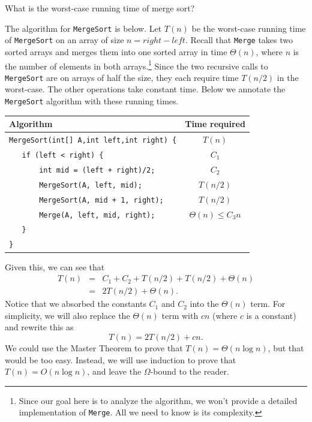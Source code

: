 \begin{exa}\label{exa:meregesortAnal}
What is the worst-case running time of merge sort?
\begin{sol}
The algorithm for \verb+MergeSort+ is below.
Let $T(n)$ be the worst-case running time of 
\verb+MergeSort+ on an array of size $n=right-left$.
Recall that \verb+Merge+ takes two sorted arrays and merges them into
one sorted array in time $\Theta(n)$, where $n$ is the number of
elements in both arrays.\footnote{Since our goal here is to analyze the algorithm,
we won't provide a detailed implementation of \texttt{Merge}. %
All we need to know is its complexity.}  
Since the two recursive calls to \verb+MergeSort+
 are on arrays
of half the size, they each require time $T(n/2)$ in the worst-case.
The other operations take constant time.  Below we annotate the \verb+MergeSort+ algorithm
with these running times.
\begin{center}
\begin{tabular}{|l|c|}
\hline
Algorithm&Time required\\
\hline
\verb-MergeSort(int[] A,int left,int right) {-&$T(n)$\\
\verb-   if (left < right) {-                 &$C_1$\\
\verb-       int mid = (left + right)/2;-     &$C_2$\\
\verb-       MergeSort(A, left, mid);-        &$T(n/2)$\\
\verb-       MergeSort(A, mid + 1, right);-   &$T(n/2)$\\
\verb-       Merge(A, left, mid, right);-     &$\Theta(n)\leq C_3n$\\
\verb-   }-&\\
\verb-}-&\\
\hline
\end{tabular}
\end{center}

Given this, we can see that
\begin{eqnarray*}
T(n)&=&C_1+C_2+T(n/2)+T(n/2)+\Theta(n)\\
&=&2 T(n/2) +\Theta(n).
\end{eqnarray*}
Notice that we absorbed the constants $C_1$ and $C_2$ into the $\Theta(n)$ term.
For simplicity, we will also replace the $\Theta(n)$ term with $cn$ (where $c$ is a constant)
and rewrite this as
 $$T(n)=2 T(n/2)+c n.$$
We could use the Master Theorem to prove that $T(n)=\Theta(n\log n)$,
 but that would be too easy. 
Instead, we will use induction to prove that $T(n)=O(n\log n)$, 
and leave the $\Omega$-bound to the reader.


\end{sol}
\end{exa}
